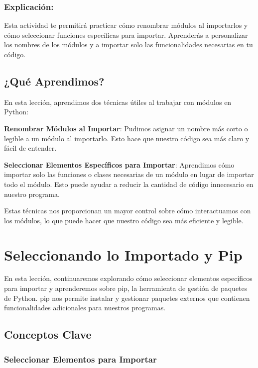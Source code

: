 \documentclass[
  a4paper,
  DIV=11,
  numbers=noendperiod,
  onepage,
  openany]{scrreprt}
\begin{document}
\subsection{Explicación:}\label{explicaciuxf3n-46}

Esta actividad te permitirá practicar cómo renombrar módulos al
importarlos y cómo seleccionar funciones específicas para importar.
Aprenderás a personalizar los nombres de los módulos y a importar solo
las funcionalidades necesarias en tu código.

\section{¿Qué Aprendimos?}\label{quuxe9-aprendimos-21}

En esta lección, aprendimos dos técnicas útiles al trabajar con módulos
en Python:

\textbf{Renombrar Módulos al Importar}: Pudimos asignar un nombre más
corto o legible a un módulo al importarlo. Esto hace que nuestro código
sea más claro y fácil de entender.

\textbf{Seleccionar Elementos Específicos para Importar}: Aprendimos
cómo importar solo las funciones o clases necesarias de un módulo en
lugar de importar todo el módulo. Esto puede ayudar a reducir la
cantidad de código innecesario en nuestro programa.

Estas técnicas nos proporcionan un mayor control sobre cómo
interactuamos con los módulos, lo que puede hacer que nuestro código sea
más eficiente y legible.

\chapter{Seleccionando lo Importado y
Pip}\label{seleccionando-lo-importado-y-pip}

En esta lección, continuaremos explorando cómo seleccionar elementos
específicos para importar y aprenderemos sobre pip, la herramienta de
gestión de paquetes de Python. pip nos permite instalar y gestionar
paquetes externos que contienen funcionalidades adicionales para
nuestros programas.

\section{Conceptos Clave}\label{conceptos-clave-26}

\subsection{Seleccionar Elementos para
Importar}\label{seleccionar-elementos-para-importar}
\end{document}
